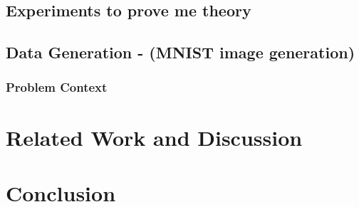 \documentclass[a4paper,12pt]{article}
\numberwithin{equation}{section}
\begin{document}
\subsection{Experiments to prove me theory}
\subsection{Data Generation - (MNIST image generation)}
\subsubsection{Problem Context}
\section{Related Work and Discussion}
\section{Conclusion}
\end{document}
